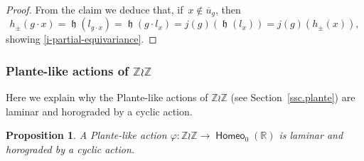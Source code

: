 \documentclass[JEP,XML,SOM,Unicode,NoFloatCountersInSection,published]{cedram}
\newtheorem{prop}[thm]{Proposition}
\theoremstyle{definition}
\DeclareMathOperator{\homeo}{\mathsf{Homeo}}
\DeclareMathOperator{\hor}{\mathfrak{h}}
\newcommand{\R}{\mathbb{R}}
\newcommand{\Z}{\mathbb Z}
\begin{document}
\begin{proof}
From the claim we deduce that, if~$x\notin \overline{u}_g$, then
\[h_\pm (g\cdot x) =\hor(l_{g\cdot x})=\hor(g\cdot l_x)=j(g)(\hor(l_x))=j(g)(h_{\pm}(x)),
\]
showing \eqref{i-partial-equivariance}.
\end{proof}

 \label{s-plante-laminations}
\subsubsection{Plante-like actions of $\Z \wr \Z$}
Here we explain why the Plante-like actions of $\Z \wr \Z$ (see Section~\ref{ssc.plante}) are laminar and horograded by a cyclic action.

\begin{prop}\label{prop Plante is laminar}
A Plante-like action $\varphi\colon \Z \wr \Z \to \homeo_0(\R)$ is laminar and horograded by a cyclic action.
\end{prop}
\end{document}
